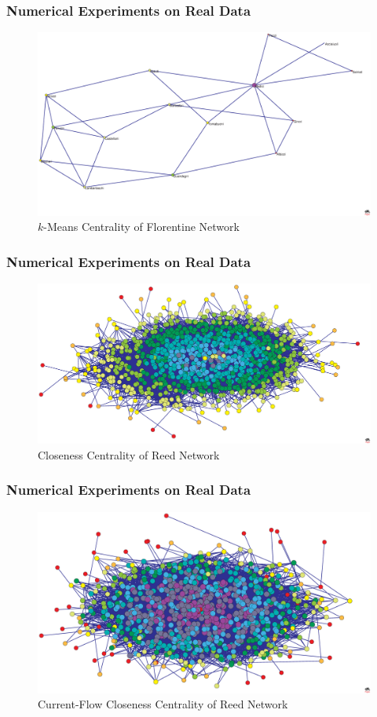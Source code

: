 \documentclass{beamer}
\begin{document}
\begin{frame}
\frametitle{Numerical Experiments on Real Data}
\begin{figure}[h]
\begin{center}
\includegraphics[width=0.76\columnwidth]{FlorentineKcentrality2}
\end{center}
\caption{$k$-Means Centrality of Florentine Network}
\label{fig:K-Centrality - Florentine}
\end{figure}
\end{frame}

\begin{frame}
\frametitle{Numerical Experiments on Real Data}
\begin{figure}[h]
\begin{center}
\includegraphics[width=0.76\columnwidth]{reed_closeness}
\end{center}
\caption{Closeness Centrality of Reed Network}
\label{fig:Closeness Centrality - Reed}
\end{figure}
\end{frame}


\begin{frame}
\frametitle{Numerical Experiments on Real Data}
\begin{figure}[h]
\begin{center}
\includegraphics[width=0.76\columnwidth]{reed_current_flow_closeness}
\end{center}
\caption{Current-Flow Closeness Centrality of Reed Network}
\label{fig:Current Flow Closeness Centrality - Reed}
\end{figure}
\end{frame}
\end{document}
